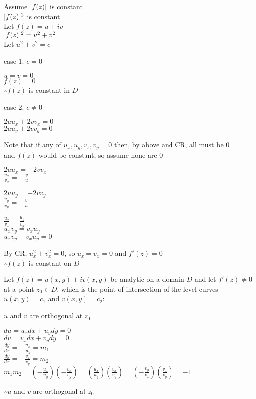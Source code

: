 \documentclass[letterpaper,12pt,fleqn]{article}
\begin{document}
\begin{theproof}[alternate]
  Assume $\lvert f(z)\rvert$ is constant \\
  $\lvert f(z)\rvert^2$ is constant \\
  Let $f(z)=u+iv$ \\
  $\lvert f(z)\rvert^2=u^2+v^2$ \\
  Let $u^2+v^2=c$
  \begin{description}
  \item case 1: $c=0$

    $u=v=0$ \\
    $f(z)=0$ \\
    $\therefore f(z)$ is constant in $D$

  \item case 2: $c\ne0$

    $2uu_x+2vv_x=0$ \\
    $2uu_y+2vv_y=0$

    Note that if any of $u_x,u_y,v_x,v_y=0$ then, by above and CR, all must be
    0 \\
    and $f(z)$ would be constant, so assume none are 0

    $2uu_x=-2vv_x$ \\
    $\frac{u_x}{v_x}=-\frac{v}{u}$
    
    $2uu_y=-2vv_y$ \\
    $\frac{u_y}{v_y}=-\frac{v}{u}$

    $\frac{u_x}{v_x}=\frac{u_y}{v_y}$ \\
    $u_xv_y=v_xu_y$ \\
    $u_xv_y-v_xu_y=0$

    By CR, $u_x^2+v_x^2=0$, so $u_x=v_x=0$ and $f'(z)=0$ \\
    $\therefore f(z)$ is constant on $D$
  \end{description}
\end{theproof}

\begin{theorem}
  Let $f(z)=u(x,y)+iv(x,y)$ be analytic on a domain $D$ and let $f'(z)\ne 0$ at
  a point $z_0\in D$, which is the point of intersection of the level curves
  $u(x,y)=c_1$ and $v(x,y)=c_2$:
  
  $u$ and $v$ are orthogonal at $z_0$
\end{theorem}

\begin{theproof}
  $du=u_xdx+u_ydy=0$ \\
  $dv=v_xdx+v_ydy=0$ \\

  $\frac{dy}{dx}=-\frac{u_x}{u_y}=m_1$ \\
  $\frac{dy}{dx}=-\frac{v_x}{v_y}=m_2$ \\

  $m_1m_2=\left(-\frac{u_x}{u_y}\right)\left(-\frac{v_x}{v_y}\right)=
  \left(\frac{u_x}{u_y}\right)\left(\frac{v_x}{v_y}\right)=
  \left(-\frac{v_y}{v_x}\right)\left(\frac{v_x}{v_y}\right)=-1$

  $\therefore u$ and $v$ are orthogonal at $z_0$
\end{theproof}
\end{document}
